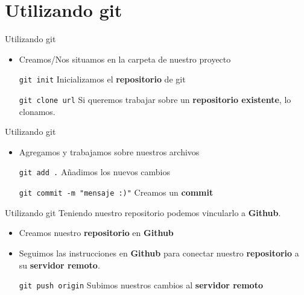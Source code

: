\documentclass{beamer}
\begin{document}
    \section{Utilizando git}
    \begin{frame}{Utilizando git}
        \begin{itemize}
            \item Creamos/Nos situamos en la carpeta de nuestro proyecto\pause
            \begin{block}{\texttt{git init}}
                Inicializamos el \textbf{repositorio} de git
            \end{block}\pause
            \begin{block}{\texttt{git clone url}}
                Si queremos trabajar sobre un \textbf{repositorio existente}, lo clonamos.
            \end{block}
        \end{itemize}
    \end{frame}
    \begin{frame}{Utilizando git}
        \begin{itemize}
            \item Agregamos y trabajamos sobre nuestros archivos\pause
            \begin{block}{\texttt{git add .}}
                Añadimos los nuevos cambios
            \end{block}\pause
            \begin{block}{\texttt{git commit -m "mensaje :)"}}
                Creamos un \textbf{commit}
            \end{block}
        \end{itemize}
    \end{frame}
    \begin{frame}{Utilizando git}
        Teniendo nuestro repositorio podemos vincularlo a \textbf{Github}.
        \begin{itemize}
            \item Creamos nuestro \textbf{repositorio} en \textbf{Github}\pause
            \item Seguimos las instrucciones en \textbf{Github} para conectar nuestro \textbf{repositorio} a su \textbf{servidor remoto}.\pause
            \begin{block}{\texttt{git push origin}}
                Subimos nuestros cambios al \textbf{servidor remoto}
            \end{block}
        \end{itemize}
    \end{frame}
\end{document}
